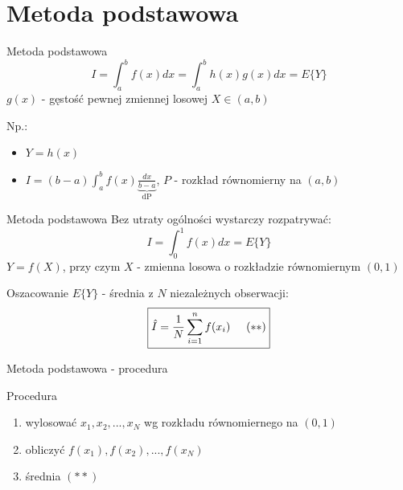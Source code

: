 \section{Metoda podstawowa}
\begin{frame}{Metoda podstawowa}
	\[
    	I = \int_a^b f(x) dx = \int_a^b h(x)g(x) dx = E\{Y\}
    \]
    $g(x)$ - gęstość pewnej zmiennej losowej $X \in (a, b)$
    
    Np.:
    \begin{itemize}
    	\item $Y = h(x)$
        \item $I = (b-a) \int_a^b f(x) \underbrace{\frac{dx}{b-a}}_\text{dP}$, $P$ - rozkład równomierny na $(a, b)$
    \end{itemize}
    
\end{frame}
\begin{frame}{Metoda podstawowa}
    Bez utraty ogólności wystarczy rozpatrywać: \[
    	I = \int_0^1 f(x) dx = E\{Y\}
    \]
    $Y = f(X)$, przy czym $X$ - zmienna losowa o rozkładzie równomiernym $(0, 1)$
    
    Oszacowanie $E\{Y\}$ - średnia z $N$ niezależnych obserwacji: \[
    	\boxed{
        \hat{I} = \frac{1}{N} \sum_{i=1}^n f(x_i) \hspace{.5cm} (**)
        }
    \]
\end{frame}
\begin{frame}{Metoda podstawowa - procedura}
    \begin{block}{Procedura}
        \begin{enumerate}[1)]
            \item wylosować $x_1, x_2, ..., x_N$ wg rozkładu równomiernego na $(0, 1)$
            \item obliczyć $f(x_1), f(x_2), ..., f(x_N)$
            \item średnia $(**)$
        \end{enumerate}
    \end{block}
\end{frame}
